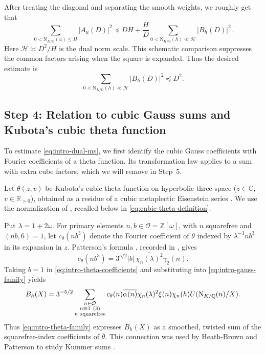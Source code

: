 \documentclass[11pt,a4paper]{article}
\numberwithin{equation}{section}
\numberwithin{figure}{section}
\theoremstyle{definition}
\theoremstyle{remark}
\newcommand{\Q}{\mathbb Q}
\newcommand{\R}{\mathbb R}
\newcommand{\NK}{\mathrm N_{K/\Q}}
\newcommand{\OO}{\mathcal O}
\newcommand{\precbd}{\preccurlyeq}
\begin{document}
 After treating the diagonal and separating the smooth weights, we roughly get that
\begin{equation}\label{eq:intro-poisson-comparison}
 \sum_{0<\NK(u)\le H}|A_u(D)|^2
 \precbd DH+\frac HD
       \sum_{0<\NK(h)\ll\mathcal H}|B_h(D)|^2.
\end{equation}
Here $\mathcal H\asymp D^2/H$ is the dual norm scale. This schematic
comparison suppresses the common factors arising when the square is
expanded. Thus the desired estimate is
\begin{equation}\label{eq:intro-dual-ms}
 \sum_{0<\NK(h)\ll\mathcal H}|B_h(D)|^2\precbd D^2.
\end{equation}

\subsection{Step 4: \texorpdfstring{Relation}{Relation} to cubic Gauss sums and Kubota's cubic theta function}

To estimate \eqref{eq:intro-dual-ms}, we first identify the cubic
Gauss coefficients with Fourier coefficients of a theta function.
Its transformation law applies to a sum with extra cube factors,
which we will remove in Step~5.

Let $\theta(z,v)$ be Kubota's cubic theta function on hyperbolic three-space ($z\in\mathbb C$, $v \in \R_{>0}$), obtained as a residue of a cubic metaplectic Eisenstein series \cite{Kub69,Pat77}. We use the normalization of \cite[\S5.1, (5.6)--(5.8)]{DR},
recalled below in \eqref{eq:cubic-theta-definition}.

Put $\lambda=1+2\omega$. For primary elements $n,b\in\OO=\mathbb Z[\omega]$, 
with $n$ squarefree and $(nb,6)=1$, let $c_\theta(nb^3)$ denote the Fourier coefficient of $\overline\theta$ indexed by $\lambda^{-3}nb^3$ in its expansion in $z$. Patterson's formula \cite[Theorem~8.1]{Pat77}, recorded in \cite[(5.7)]{DR}, gives
\begin{equation}\label{eq:intro-theta-coefficients}
 c_\theta(nb^3)
     =3^{5/2}|b|\,\overline{\chi_n(\lambda)^2}\gamma_2(n).
\end{equation}
Taking $b=1$ in \eqref{eq:intro-theta-coefficients} and substituting into \eqref{eq:intro-gauss-family} yields
\begin{equation}\label{eq:intro-theta-family}
 B_h(X)=3^{-5/2}\sum_{\substack{n\in\OO\\n\equiv1\ (3)\\n\ {\rm squarefree}}}
 c_\theta(n)\overline{\alpha(n)}\chi_n(\lambda)^2
 \xi(n)\chi_n(h)U(\NK(n)/X).
\end{equation}
Thus \eqref{eq:intro-theta-family} expresses $B_h(X)$ as a smoothed, twisted sum of the squarefree-index coefficients of $\overline\theta$. This connection was used by Heath-Brown and Patterson to study Kummer sums \cite{HBP79}.
\end{document}
